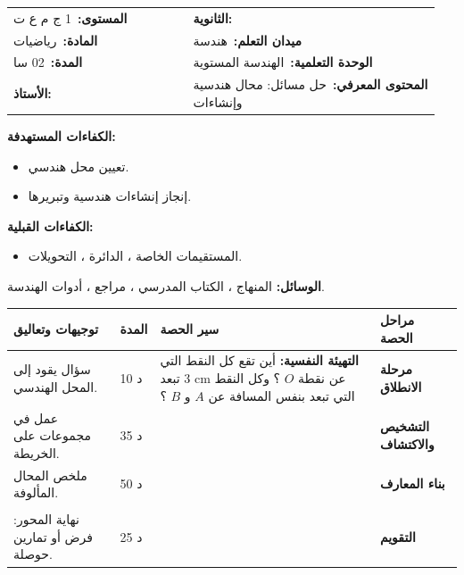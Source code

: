 \documentclass[12pt,a4paper]{article}
\makeatletter
\newenvironment{LTR}{\begin{otherlanguage}{english}}{\end{otherlanguage}}
\newcommand{\ar}[1]{\foreignlanguage{arabic}{#1}}
\newcommand{\Phase}[1]{\textbf{#1}}
\newcommand{\Fld}[2]{\textbf{#1:}\ #2}
\newcommand{\ModhHead}[9]{%
\begin{LTR}
\begin{tcolorbox}[enhanced,colback=white,colframe=cThm!85!black,arc=4mm,boxrule=1pt,top=14pt,bottom=6pt,left=8pt,right=8pt,
 overlay={\node[fill=cThm!85!black,text=white,rounded corners=3mm,inner xsep=14pt,inner ysep=4pt,font=\large\bfseries] at ([yshift=0pt]frame.north){\ar{مذكرة رقم #1}};},
 before upper={\selectlanguage{arabic}}]
\begin{tabular}{@{}p{0.4\linewidth}p{0.55\linewidth}@{}}
\Fld{المستوى}{#2} & \Fld{الثانوية}{\dotfill}\\[3pt]
\Fld{المادة}{رياضيات} & \Fld{ميدان التعلم}{#3}\\[3pt]
\Fld{المدة}{#5} & \Fld{الوحدة التعلمية}{#4}\\[3pt]
\Fld{الأستاذ}{\dotfill} & \Fld{المحتوى المعرفي}{#6}\\
\end{tabular}
\end{tcolorbox}
\begin{tcolorbox}[enhanced,colback=white,colframe=cThm!85!black,arc=3mm,boxrule=0.8pt,sidebyside,sidebyside align=top,lefthand ratio=0.5,
 segmentation style={dashed,cThm!60},before upper={\selectlanguage{arabic}},before lower={\selectlanguage{arabic}}]
\textbf{الكفاءات المستهدفة:}\par #8
\tcblower
\textbf{الكفاءات القبلية:}\par #7
\end{tcolorbox}
\end{LTR}
\par\smallskip\textbf{الوسائل:} #9\par\smallskip}
\newenvironment{Sayr}{%
\begin{LTR}\renewcommand{\arraystretch}{1.25}
\begin{longtable}{|p{0.17\textwidth}|>{\centering\arraybackslash}p{0.06\textwidth}|p{0.53\textwidth}|>{\centering\arraybackslash}p{0.12\textwidth}|}
\hline\rowcolor{cThm!12}\ar{\textbf{توجيهات وتعاليق}} & \ar{\textbf{المدة}} & \ar{\textbf{سير الحصة}} & \ar{\textbf{مراحل الحصة}}\\\hline\endhead
\hline\endfoot}{\end{longtable}\end{LTR}}
\newcommand{\Row}[4]{\ar{\small #4} & \ar{#3} & \ar{#2} & \cellcolor{cThm!8}\ar{\Phase{#1}}\\\hline}
\newcommand{\Lab}[2]{\foreignlanguage{english}{\tcbox[on line,colback=#1,colframe=#1,boxrule=0pt,arc=2pt,boxsep=1pt,left=5pt,right=5pt,top=1pt,bottom=1pt]{\ar{\textcolor{white}{\textbf{#2}}}}}}
\newcommand{\ck}{\ensuremath{{\color{cRem}\checkmark}}}
\makeatother
\begin{document}
\newpage
\ModhHead{42}{1 ج م ع ت}{هندسة}{الهندسة المستوية}{02 سا}{حل مسائل: محال هندسية وإنشاءات}%
{\begin{itemize}\item المستقيمات الخاصة ، الدائرة ، التحويلات.\end{itemize}}%
{\begin{itemize}\item تعيين محل هندسي.\item إنجاز إنشاءات هندسية وتبريرها.\end{itemize}}%
{المنهاج ، الكتاب المدرسي ، مراجع ، أدوات الهندسة.}
\begin{Sayr}
\Row{مرحلة الانطلاق}{%
\textbf{التهيئة النفسية:} أين تقع كل النقط التي تبعد $3$ cm عن نقطة $O$ ؟ وكل النقط التي تبعد بنفس المسافة عن $A$ و $B$ ؟}{10 د}{سؤال يقود إلى المحل الهندسي.}
\Row{التشخيص والاكتشاف}{%
\Lab{cEx}{وضعية مقترحة}\par نريد بناء بئر على طريق مستقيم $(d)$ بحيث يبعد بنفس المسافة عن منزلين $A$ و $B$. أين نضعه؟\par\ck\ النقط المتساوية البعد عن $A$ و $B$ هي محور $[AB]$.\par
\ck\ البئر هو نقطة تقاطع محور $[AB]$ مع $(d)$ (إن وُجدت).\par
}{35 د}{عمل في مجموعات على الخريطة.}
\Row{بناء المعارف}{%
\Lab{cDef}{تعريف}\ \textbf{المحل الهندسي} مجموعة النقط التي تحقق خاصية معينة.\par\Lab{cThm}{محال مألوفة}\par\ck\ النقط التي تبعد $r$ عن $O$: الدائرة التي مركزها $O$ ونصف قطرها $r$.\par
\ck\ النقط المتساوية البعد عن $A$ و $B$: محور $[AB]$.\par
\ck\ النقط المتساوية البعد عن ضلعي زاوية: منصفها.\par
\ck\ النقط $M$ حيث $\widehat{AMB}=90^\circ$: الدائرة التي قطرها $[AB]$ (باستثناء $A$ و $B$).\par
}{50 د}{ملخص المحال المألوفة.}
\Row{}{%
\Lab{cMeth}{طريقة}\ نخمّن بالرسم ، ثم نبرهن بالخواص ، ثم ننشئ ونبرر الإنشاء.\par\Lab{cThm!80!black}{حذار}\ نتأكد من الاحتواءين: كل نقطة من المحل تحقق الخاصية ، وكل نقطة تحققها تنتمي إليه.}{}{}
\Row{التقويم}{%
\Lab{cEx}{تطبيق}\par أنشئ مثلثاً $ABC$ حيث $AB=5$ ، $BC=4$ ، $AC=3$ ، ثم أنشئ دائرته المحيطة. ما طبيعة المثلث؟ أين يقع مركز الدائرة؟\par\textbf{الحل:} $9+16=25$: قائم في $C$ ، ومركز الدائرة منتصف $[AB]$.\par\textbf{واجب منزلي:} تمارين حوصلة المحور من الكتاب المدرسي.\par\smallskip\textbf{ملاحظات حول سير الحصة:} \dotfill}{25 د}{نهاية المحور: فرض أو تمارين حوصلة.}
\end{Sayr}
\end{document}
